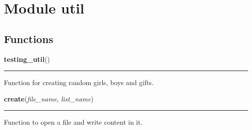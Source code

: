 %
%
%


\section{Module util}

    \label{util}


  \subsection{Functions}

    \label{util:testing_util}

    \vspace{0.5ex}

\hspace{.8\funcindent}\begin{boxedminipage}{\funcwidth}

    \raggedright \textbf{testing\_util}()

    \vspace{-1.5ex}

    \rule{\textwidth}{0.5\fboxrule}
\setlength{\parskip}{2ex}
    Function for creating random girls, boys and gifts.

\setlength{\parskip}{1ex}
    \end{boxedminipage}

    \label{util:create}

    \vspace{0.5ex}

\hspace{.8\funcindent}\begin{boxedminipage}{\funcwidth}

    \raggedright \textbf{create}(\textit{file\_name}, \textit{list\_name})

    \vspace{-1.5ex}

    \rule{\textwidth}{0.5\fboxrule}
\setlength{\parskip}{2ex}
    Function to open a file and write content in it.

\setlength{\parskip}{1ex}
    \end{boxedminipage}


